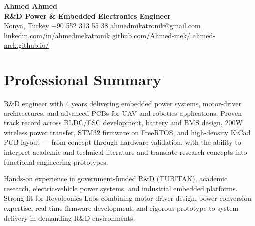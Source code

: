 \documentclass[a4paper,10pt]{article}
\begin{document}
\begin{center}
  {\LARGE \textbf{\color{navyblue}Ahmed Ahmed}}\\
  \vspace{3pt}
  {\large \textbf{R\&D Power \& Embedded Electronics Engineer}}\\
  \vspace{4pt}
  \small
  Konya, Turkey
  \;\textbullet\;
  +90 552 313 55 38
  \;\textbullet\;
  \href{mailto:ahmedmikatronik@gmail.com}{ahmedmikatronik@gmail.com}
  \;\textbullet\;
      \href{https://www.linkedin.com/in/ahmedmekatronik/}{linkedin.com/in/ahmedmekatronik}
      \;\textbullet\;
      \href{https://github.com/Ahmed-mek/}{github.com/Ahmed-mek/}
      \;\textbullet\;
      \href{https://ahmed-mek.github.io/}{ahmed-mek.github.io/}
\end{center}

\vspace{2pt}

\section*{Professional Summary}
R\&D engineer with 4 years delivering embedded power systems, motor-driver architectures, and
advanced PCBs for UAV and robotics applications. Proven track record across BLDC/ESC
development, battery and BMS design, 200W wireless power transfer, STM32 firmware on FreeRTOS,
and high-density KiCad PCB layout --- from concept through hardware validation, with the ability
to interpret academic and technical literature and translate research concepts into functional
engineering prototypes.

Hands-on experience in government-funded R\&D (TUBITAK), academic research,
electric-vehicle power systems, and industrial embedded platforms. Strong fit for Revotronics
Labs combining motor-driver design, power-conversion expertise, real-time firmware development,
and rigorous prototype-to-system delivery in demanding R\&D environments.



\end{document}
